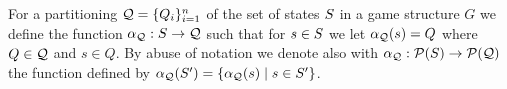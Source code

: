 For a partitioning $\mathcal{Q} = \{Q_i\}_{i=1}^n$ of the set of states $S$ in a game structure $G$ we define the function $\alpha_{\mathcal{Q}} : S \to \mathcal{Q}$ such that for $s \in S$ we let $\alpha_{\mathcal{Q}}(s) = Q$ where $Q \in \mathcal{Q}$ and $s \in Q$.
By abuse of notation we denote also with $\alpha_{\mathcal{Q}} : \mathcal{P}(S) \to \mathcal{P}(\mathcal{Q})$ the function defined by $\alpha_{\mathcal{Q}}(S') = \{\alpha_{\mathcal{Q}}(s) \mid s \in S'\}$.

